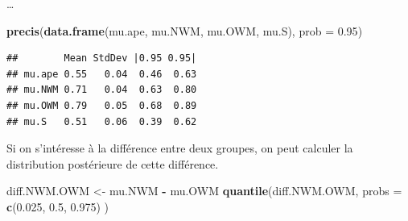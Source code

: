 \documentclass[
  a4paper,11pt,twoside,onecolumn,openright,final,oldfontcommands]{memoir}
\newenvironment{Shaded}{\begin{snugshade}}{\end{snugshade}}
\newcommand{\CommentTok}[1]{\textcolor[rgb]{0.56,0.35,0.01}{\textit{#1}}}
\newcommand{\DataTypeTok}[1]{\textcolor[rgb]{0.13,0.29,0.53}{#1}}
\newcommand{\FloatTok}[1]{\textcolor[rgb]{0.00,0.00,0.81}{#1}}
\newcommand{\KeywordTok}[1]{\textcolor[rgb]{0.13,0.29,0.53}{\textbf{#1}}}
\newcommand{\NormalTok}[1]{#1}
\newcommand{\OperatorTok}[1]{\textcolor[rgb]{0.81,0.36,0.00}{\textbf{#1}}}
\newcommand{\StringTok}[1]{\textcolor[rgb]{0.31,0.60,0.02}{#1}}
\theoremstyle{definition}
\theoremstyle{definition}
\theoremstyle{definition}
\theoremstyle{remark}
\begin{document}
\ldots{}

\begin{Shaded}
\end{Shaded}

\begin{Shaded}
\begin{Highlighting}[]
\KeywordTok{precis}\NormalTok{(}\KeywordTok{data.frame}\NormalTok{(mu.ape, mu.NWM, mu.OWM, mu.S), }\DataTypeTok{prob =} \FloatTok{0.95}\NormalTok{)}
\end{Highlighting}
\end{Shaded}

\begin{verbatim}
##        Mean StdDev |0.95 0.95|
## mu.ape 0.55   0.04  0.46  0.63
## mu.NWM 0.71   0.04  0.63  0.80
## mu.OWM 0.79   0.05  0.68  0.89
## mu.S   0.51   0.06  0.39  0.62
\end{verbatim}

Si on s'intéresse à la différence entre deux groupes, on peut calculer la distribution postérieure de cette différence.

\begin{Shaded}
\begin{Highlighting}[]
\NormalTok{diff.NWM.OWM \textless{}{-}}\StringTok{ }\NormalTok{mu.NWM }\OperatorTok{{-}}\StringTok{ }\NormalTok{mu.OWM}
\KeywordTok{quantile}\NormalTok{(diff.NWM.OWM, }\DataTypeTok{probs =} \KeywordTok{c}\NormalTok{(}\FloatTok{0.025}\NormalTok{, }\FloatTok{0.5}\NormalTok{, }\FloatTok{0.975}\NormalTok{) )}
\end{Highlighting}
\end{Shaded}
\end{document}
